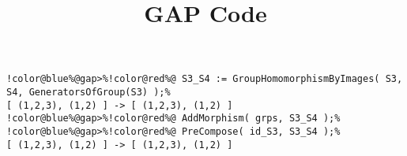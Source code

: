 \documentclass[12pt]{amsart}
\title{GAP Code}
\author{}
\begin{document}
\maketitle

\begin{Verbatim}[commandchars=!@\%,frame=single]
!color@blue%@gap>%!color@red%@ S3_S4 := GroupHomomorphismByImages( S3, S4, GeneratorsOfGroup(S3) );%
[ (1,2,3), (1,2) ] -> [ (1,2,3), (1,2) ]
!color@blue%@gap>%!color@red%@ AddMorphism( grps, S3_S4 );%
!color@blue%@gap>%!color@red%@ PreCompose( id_S3, S3_S4 );%
[ (1,2,3), (1,2) ] -> [ (1,2,3), (1,2) ]
\end{Verbatim}
\end{document}
